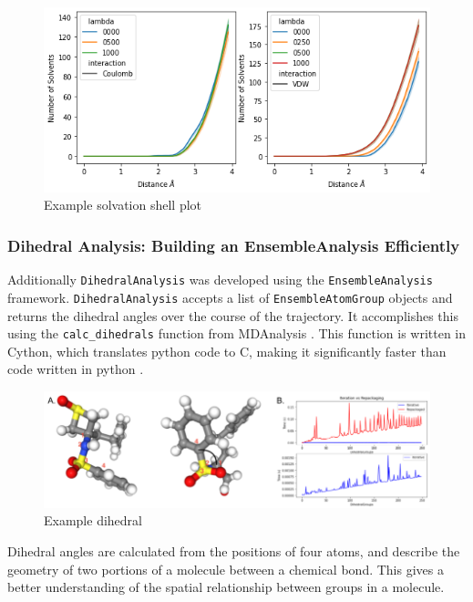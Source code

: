 \documentclass{article}[letterpaper, margins=1in, 12pt]
\begin{document}
\begin{figure}[h]
    \centering
	\includegraphics[scale=0.5]{solv_plot}
	\caption{Example solvation shell plot}
	\label{fig:solvation}
\end{figure}
 

\subsubsection{Dihedral Analysis: Building an EnsembleAnalysis Efficiently}

Additionally \texttt{DihedralAnalysis} was developed using the \texttt{EnsembleAnalysis} framework. \texttt{DihedralAnalysis} accepts a list of \texttt{EnsembleAtomGroup} objects and returns the dihedral angles over the course of the trajectory. It accomplishes this using the \lstinline{calc_dihedrals} function from MDAnalysis \cite{michaud-agrawal_mdanalysis_2011, gowers_mdanalysis_2016}. This function is written in Cython, which translates python code to C, making it significantly faster than code written in python \cite{Mull2018}. 

\begin{figure}[h]
    \centering
	\includegraphics[scale=0.5]{Dihedral}
	\caption{Example dihedral}
	\label{fig:dihedral}
\end{figure}

Dihedral angles are calculated from the positions of four atoms, and describe the geometry of two portions of a molecule between a chemical bond. This gives a better understanding of the spatial relationship between groups in a molecule.   
\end{document}
